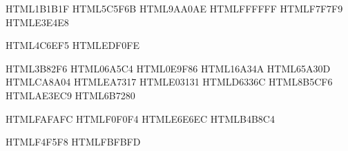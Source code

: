 
\definecolor{ink}        {HTML}{1B1B1F}  %
\definecolor{inkmuted}   {HTML}{5C5F6B}  %
\definecolor{inkfaint}   {HTML}{9AA0AE}  %
\definecolor{paper}      {HTML}{FFFFFF}
\definecolor{papersoft}  {HTML}{F7F7F9}  %
\definecolor{rule}       {HTML}{E3E4E8}  %

\definecolor{accent}     {HTML}{4C6EF5}  %
\definecolor{accentsoft} {HTML}{EDF0FE}

\definecolor{blue}       {HTML}{3B82F6}
\definecolor{cyan}       {HTML}{06A5C4}
\definecolor{teal}       {HTML}{0E9F86}
\definecolor{green}      {HTML}{16A34A}
\definecolor{lime}       {HTML}{65A30D}
\definecolor{yellow}     {HTML}{CA8A04}
\definecolor{orange}     {HTML}{EA7317}
\definecolor{red}        {HTML}{E03131}
\definecolor{pink}       {HTML}{D6336C}
\definecolor{purple}     {HTML}{8B5CF6}
\definecolor{grape}      {HTML}{AE3EC9}
\definecolor{gray}       {HTML}{6B7280}

\definecolor{codebg}     {HTML}{FAFAFC}
\definecolor{codechrome} {HTML}{F0F0F4}  %
\definecolor{codeborder} {HTML}{E6E6EC}
\definecolor{codegutter} {HTML}{B4B8C4}  %

\definecolor{tablehead}  {HTML}{F4F5F8}
\definecolor{tablezebra} {HTML}{FBFBFD}
